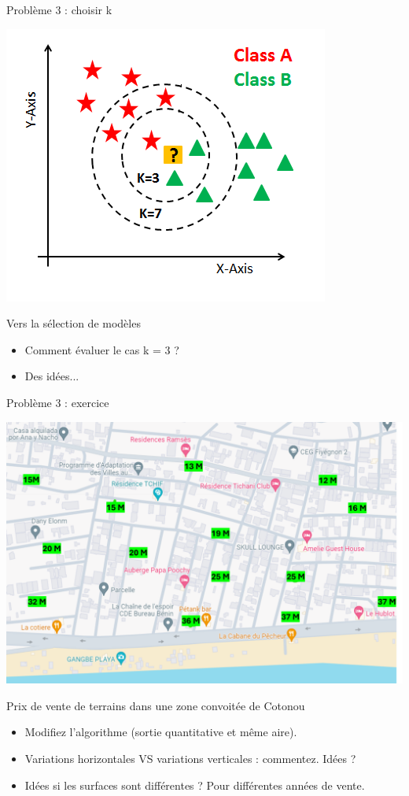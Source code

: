 \documentclass[10pt]{beamer}
\begin{document}

 
 \begin{frame}{Problème 3 : choisir k} 
 
\begin{center}
\includegraphics[height=0.4\textwidth]{figures/knn_comparaison.png}
\end{center} 
 
\begin{block}{Vers la sélection de modèles}
\small {\begin{itemize}
\item Comment évaluer le cas k = 3 ? 
\item Des idées... 
\end{itemize}}
\end{block} 
\end{frame}


 \begin{frame}{Problème 3 : exercice} 
 
\begin{center}
\includegraphics[height=0.4\textwidth]{figures/Prix_terrains.png}
\end{center} 
 
\begin{block}{Prix de vente de terrains dans une zone convoitée de Cotonou}
\small {\begin{itemize}
\item Modifiez l'algorithme (sortie quantitative et même aire). 
\item Variations horizontales VS variations verticales : commentez. Idées ?
\item Idées si les surfaces sont différentes ? Pour différentes années de vente.
\end{itemize}}
\end{block} 
\end{frame}
\end{document}
